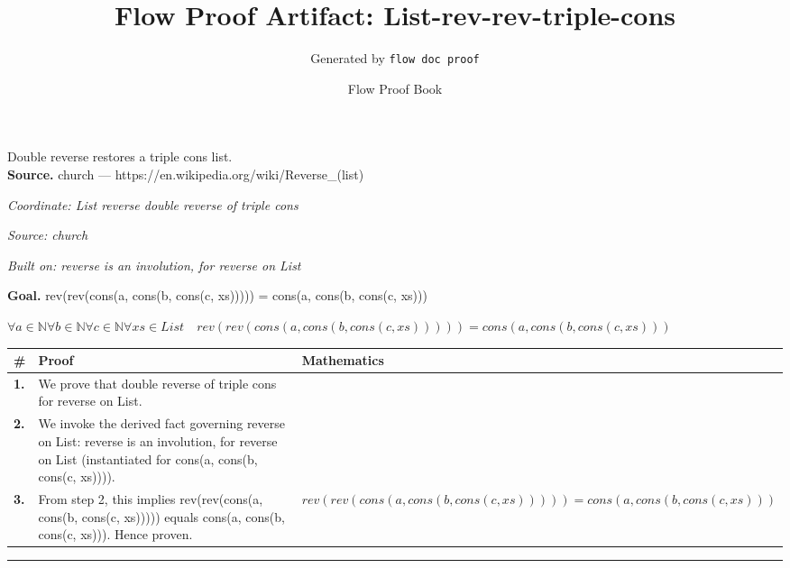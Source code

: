\documentclass[11pt]{article}
\title{Flow Proof Artifact: List-rev-rev-triple-cons}
\author{Generated by \texttt{flow doc proof}}
\date{Flow Proof Book}
\theoremstyle{definition}
\begin{document}
\maketitle
Double reverse restores a triple cons list.\\[0.5em]
\textbf{Source.} church — https://en.wikipedia.org/wiki/Reverse\_(list)\\[0.5em]
\bigskip
{}\par
\smallskip\noindent\textit{Coordinate: List \cdot reverse \cdot double reverse of triple cons}\par
\smallskip\noindent\textit{Source: church}\par
\smallskip\noindent\textit{Built on: reverse is an involution, for reverse on List}\par
\medskip
\noindent\textbf{Goal.} rev(rev(cons(a, cons(b, cons(c, xs))))) = cons(a, cons(b, cons(c, xs)))\par
\noindent$\displaystyle \forall a \in \mathbb{N} \forall b \in \mathbb{N} \forall c \in \mathbb{N} \forall xs \in List\quad rev(rev(cons(a, cons(b, cons(c, xs))))) = cons(a, cons(b, cons(c, xs)))$\par
\medskip
\noindent
\begin{tabular}{@{} >{\raggedright\arraybackslash}p{} >{\raggedright\arraybackslash}p{} >{\raggedleft\arraybackslash}p{} @{}}
\textbf{\#} & \textbf{Proof} & \textbf{Mathematics} \\
\midrule
\textbf{1.} & We prove that double reverse of triple cons for reverse on List. & \\[0.45em]
\textbf{2.} & We invoke the derived fact governing reverse on List: reverse is an involution, for reverse on List (instantiated for cons(a, cons(b, cons(c, xs)))). & \\[0.45em]
\textbf{3.} & From step 2, this implies rev(rev(cons(a, cons(b, cons(c, xs))))) equals cons(a, cons(b, cons(c, xs))). Hence proven. & $\displaystyle rev(rev(cons(a, cons(b, cons(c, xs))))) = cons(a, cons(b, cons(c, xs)))$ \\[0.45em]
\bottomrule
\end{tabular}
\label{thm:List-reverse-double_reverse_of_triple_cons}
\par\medskip\hrule
\end{document}

